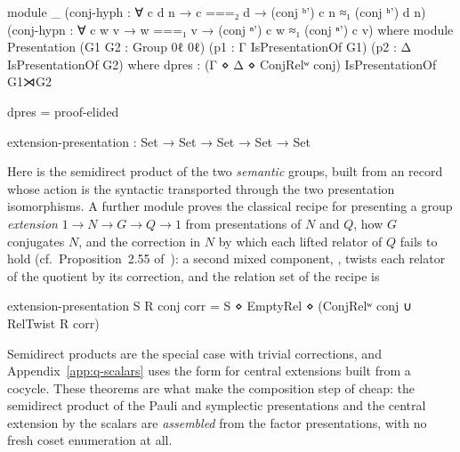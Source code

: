 \begingroup\renewcommand{\AgdaCodeStyle}{\footnotesize}
\begin{code}
module _ (conj-hyph : ∀ {c d} n → c ===₂ d → (conj ʰ') c n ≈₁ (conj ʰ') d n)
         (conj-hypn : ∀ c {w v} → w ===₁ v → (conj ⁿ') c w ≈₁ (conj ⁿ') c v) where
  module Presentation (G1 G2 : Group 0ℓ 0ℓ)
    (p1 : Γ IsPresentationOf G1) (p2 : Δ IsPresentationOf G2) where
    dpres : (Γ ⋄ Δ ⋄ ConjRelʷ conj) IsPresentationOf G1⋊G2
\end{code}
\endgroup
\begin{code}[hide]
    dpres = proof-elided

extension-presentation : Set → Set → Set → Set → Set
\end{code}

\noindent Here  is the semidirect product of the two
\emph{semantic} groups, built from an  record whose action
is the syntactic  transported through the two presentation
isomorphisms.  A further module proves the classical recipe for
presenting a group \emph{extension} $1 \to N \to G \to Q \to 1$ from
presentations of $N$ and $Q$, how $G$ conjugates $N$, and the
correction in $N$ by which each lifted relator of $Q$ fails to hold
(cf.\ Proposition~2.55 of~\cite{holt2005handbook}): a second mixed
component, , twists each relator of the quotient by its
correction, and the relation set of the recipe is
\begingroup\renewcommand{\AgdaCodeStyle}{\footnotesize}
\begin{code}
extension-presentation S R conj corr = S ⋄ EmptyRel ⋄ (ConjRelʷ conj ∪ RelTwist R corr)
\end{code}
\endgroup
Semidirect products are the special case with trivial corrections, and
Appendix~\ref{app:q-scalars} uses the form for central extensions built
from a cocycle.  These theorems are what make the composition step of
 cheap: the semidirect product of the Pauli and
symplectic presentations and the central extension by the scalars are
\emph{assembled} from the factor presentations, with no fresh coset
enumeration at all.
